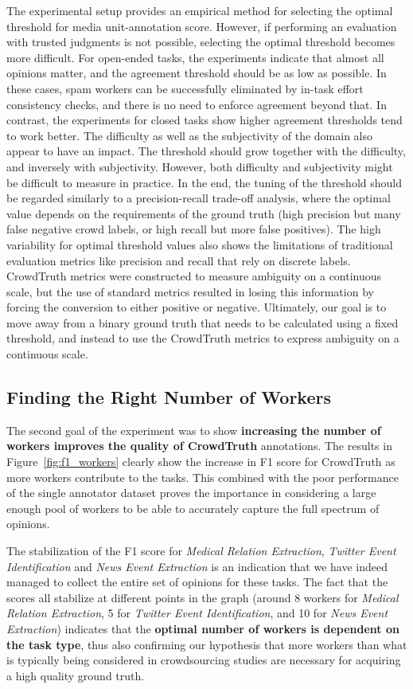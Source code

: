 The experimental setup provides an empirical method for selecting the optimal threshold for media unit-annotation score.  However, if performing an evaluation with trusted judgments is not possible, selecting the optimal threshold becomes more difficult.  For open-ended tasks, the experiments indicate that almost all opinions matter, and the agreement threshold should be as low as possible.  In these cases, spam workers can be successfully eliminated by in-task effort consistency checks, and there is no need to enforce agreement beyond that.  In contrast, the experiments for closed tasks show higher agreement thresholds tend to work better.  The difficulty as well as the subjectivity of the domain also appear to have an impact.  The threshold should grow together with the difficulty, and inversely with subjectivity.  However, both difficulty and subjectivity might be difficult to measure in practice.  In the end, the tuning of the threshold should be regarded similarly to a precision-recall trade-off analysis, where the optimal value depends on the requirements of the ground truth (high precision but many false negative crowd labels, or high recall but more false positives).  The high variability for optimal threshold values also shows the limitations of traditional evaluation metrics like precision and recall that rely on discrete labels.  CrowdTruth metrics were constructed to measure ambiguity on a continuous scale, but the use of standard metrics resulted in losing this information by forcing the conversion to either positive or negative. Ultimately, our goal is to move away from a binary ground truth that needs to be calculated using a fixed threshold, and instead to use the CrowdTruth metrics to express ambiguity on a continuous scale.


\subsection{Finding the Right Number of Workers}


The second goal of the experiment was to show \textbf{increasing the number of workers improves the quality of CrowdTruth} annotations.  The results in Figure~\ref{fig:f1_workers} clearly show the increase in F1 score for CrowdTruth as more workers contribute to the tasks. This combined with the poor performance of the single annotator dataset proves the importance in considering a large enough pool of workers to be able to accurately capture the full spectrum of opinions.

The stabilization of the F1 score for \textit{Medical Relation Extraction}, \textit{Twitter Event Identification} and \textit{News Event Extraction} is an indication that we have indeed managed to collect the entire set of opinions for these tasks.  The fact that the scores all stabilize at different points in the graph (around 8 workers for \textit{Medical Relation Extraction}, 5 for \textit{Twitter Event Identification}, and 10 for \textit{News Event Extraction}) indicates that the \textbf{optimal number of workers is dependent on the task type}, thus also confirming our hypothesis that more workers than what is typically being considered in crowdsourcing studies are necessary for acquiring a high quality ground truth.

